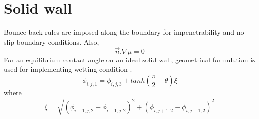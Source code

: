 \documentclass{article}
\begin{document}
\section{Solid wall}
Bounce-back rules \cite{paper:bounce_back} are imposed along the boundary for impenetrability and no-slip boundary conditions. Also,
\begin{equation}
	\vec{n}.\nabla\mu = 0
\end{equation}
 For an equilibrium contact angle on an ideal solid wall, geometrical formulation is used for implementing wetting condition \cite{paper:contact_angle,PhysRevE.75.046708}.
 \begin{equation}
 \phi_{i,j,1} = \phi_{i,j,3} + tanh(\frac{\pi}{2}-\theta) \xi
 \end{equation}
 where 
 \begin{equation}
 	\xi = \sqrt{(\phi_{i+1,j,2}-\phi_{i-1,j,2})^{2}+(\phi_{i,j+1,2}-\phi_{i,j-1,2})^{2}}
 \label{eqn_wetting_bc}
 \end{equation}
\end{document}
